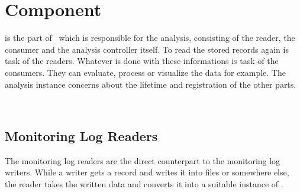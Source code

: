 % 


\chapter{\KiekerAnalysisPart{} Component}\label{chap:componentsAnalysis}


\class{\KiekerAnalysisPart} is the part of \Kieker\  which is responsible for the analysis, consisting of the reader, the consumer and the analysis controller itself. To read the stored records again is task of the readers. Whatever is done with these informations is task of the consumers. They can evaluate, process or visualize the data for example. The analysis instance concerns about the lifetime and registration of the other parts.

\


\section{Monitoring Log Readers}\label{sec:analysis:reader}

The monitoring log readers are the direct counterpart to the monitoring log writers. While a writer gets a record and writes it into files or somewhere else, the reader takes the written data and converts it into a suitable instance of .

\


